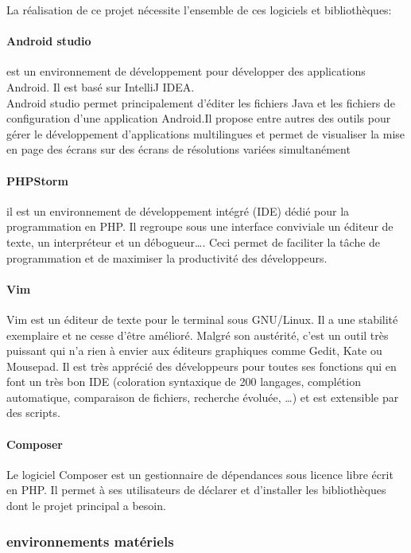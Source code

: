 La réalisation de ce projet nécessite l'ensemble de ces logiciels et
bibliothèques:

\paragraph{Android studio}
est un environnement de développement pour développer des applications Android.
Il est basé sur IntelliJ IDEA.\\ Android studio permet principalement d'éditer
les fichiers Java et les fichiers de configuration d'une application Android.Il
propose entre autres des outils pour gérer le développement d'applications
multilingues et permet de visualiser la mise en page des écrans sur des écrans
de résolutions variées simultanément

\paragraph{PHPStorm}
il est un environnement de développement intégré (IDE) dédié pour la
programmation en PHP. Il regroupe sous une interface conviviale un éditeur de
texte, un interpréteur et un débogueur\ldots. Ceci permet de faciliter la tâche de
programmation et de maximiser la productivité des développeurs.

\paragraph{Vim}
Vim est un éditeur de texte pour le terminal sous GNU/Linux. Il a une
stabilité exemplaire et ne cesse d'être amélioré. Malgré son austérité, c'est
un outil très puissant qui n'a rien à envier aux éditeurs graphiques comme
Gedit, Kate ou Mousepad. Il est très apprécié des développeurs pour toutes ses
fonctions qui en font un très bon IDE (coloration syntaxique de 200 langages,
complétion automatique, comparaison de fichiers, recherche évoluée, …) et est
extensible par des scripts.
\paragraph{Composer}

Le logiciel Composer est un gestionnaire de dépendances sous licence libre
écrit en PHP\@. Il permet à ses utilisateurs de déclarer et d'installer les
bibliothèques dont le projet principal a besoin.

\subsubsection{environnements matériels}

